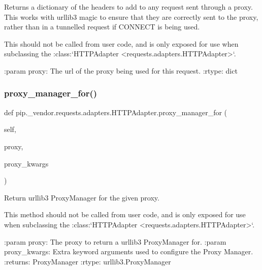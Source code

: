 \begin{DoxyVerb}Returns a dictionary of the headers to add to any request sent
through a proxy. This works with urllib3 magic to ensure that they are
correctly sent to the proxy, rather than in a tunnelled request if
CONNECT is being used.

This should not be called from user code, and is only exposed for use
when subclassing the
:class:`HTTPAdapter <requests.adapters.HTTPAdapter>`.

:param proxy: The url of the proxy being used for this request.
:rtype: dict
\end{DoxyVerb}
 \mbox{\label{classpip_1_1__vendor_1_1requests_1_1adapters_1_1HTTPAdapter_a08a9fb0779c70ed124a151e7e21e4e64}} 
\subsubsection{\texorpdfstring{proxy\+\_\+manager\+\_\+for()}{proxy\_manager\_for()}}
{\footnotesize\ttfamily def pip.\+\_\+vendor.\+requests.\+adapters.\+H\+T\+T\+P\+Adapter.\+proxy\+\_\+manager\+\_\+for (\begin{DoxyParamCaption}\item[{}]{self,  }\item[{}]{proxy,  }\item[{}]{proxy\+\_\+kwargs }\end{DoxyParamCaption})}

\begin{DoxyVerb}Return urllib3 ProxyManager for the given proxy.

This method should not be called from user code, and is only
exposed for use when subclassing the
:class:`HTTPAdapter <requests.adapters.HTTPAdapter>`.

:param proxy: The proxy to return a urllib3 ProxyManager for.
:param proxy_kwargs: Extra keyword arguments used to configure the Proxy Manager.
:returns: ProxyManager
:rtype: urllib3.ProxyManager
\end{DoxyVerb}
 \mbox{\label{classpip_1_1__vendor_1_1requests_1_1adapters_1_1HTTPAdapter_aada71ac3613d6c3fcdc7e2049d49854e}} 
